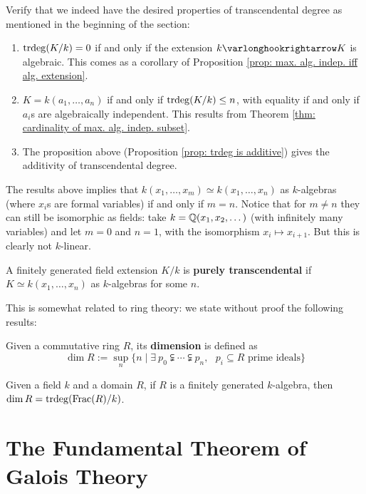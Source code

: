 Verify that we indeed have the desired properties of transcendental degree as mentioned in the beginning of the section:
\begin{enumerate}[label=\arabic*)]
    \item $\operatorname{trdeg}(K/k) = 0$ if and only if the extension $k \ext K$ is algebraic. This comes as a corollary of Proposition \ref{prop: max. alg. indep. iff alg. extension}.
    \item $K = k(a_1, \dots, a_n)$ if and only if $\operatorname{trdeg}(K/k) \leq n$, with equality if and only if $a_i$s are algebraically independent. This results from Theorem \ref{thm: cardinality of max. alg. indep. subset}.
    \item The proposition above (Proposition \ref{prop: trdeg is additive}) gives the additivity of transcendental degree.
\end{enumerate}

\begin{remark}
    The results above implies that $k(x_1, \dots, x_m) \simeq k(x_1, \dots, x_n)$ as $k$-algebras (where $x_i$s are formal variables) if and only if $m = n$. Notice that for $m \neq n$ they can still be isomorphic as fields: take $k = \mathbb{Q}(x_1, x_2, \dots)$ (with infinitely many variables) and let $m = 0$ and $n = 1$, with the isomorphism $x_i \mapsto x_{i+1}$. But this is clearly not $k$-linear. 
\end{remark}

\begin{definition}
    A finitely generated field extension $K/k$ is \textbf{purely transcendental} if $K \simeq k(x_1, \dots, x_n)$ as $k$-algebras for some $n$. 
\end{definition}

This is somewhat related to ring theory: we state without proof the following results:

\begin{definition}
    Given a commutative ring $R$, its \textbf{dimension} is defined as
    \[
        \dim R := \sup_n \{ n \mid \exists\ p_0 \subsetneqq \cdots \subsetneqq p_n, \text{ $p_i \subseteq R$ prime ideals} \}
    \]
\end{definition}

\begin{theorem}
    Given a field $k$ and a domain $R$, if $R$ is a finitely generated $k$-algebra, then $\dim R = \operatorname{trdeg}(\mathrm{Frac}(R)/k)$.
\end{theorem}

\section{The Fundamental Theorem of Galois Theory}

